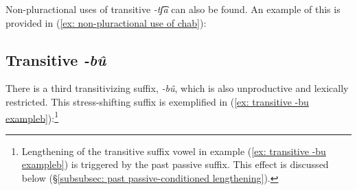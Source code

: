 Non-pluractional uses of transitive \textit{-tʃ͡a} can also be found. An example of this is provided in (\ref{ex: non-pluractional use of chab}):

\ea\label{ex: non-pluractional use of cha}

    \label{ex: non-pluractional use of chaa}
        \label{ex: non-pluractional use of chab}
    \z
\z

\subsection{Transitive \textit{-bû}}
\label{subsec: transitive -bû}

There is a third transitivizing suffix, \textit{-bû}, which is also unproductive and lexically restricted. This stress-shifting suffix is exemplified in (\ref{ex: transitive -bu exampleb}):\footnote{Lengthening of the transitive suffix vowel in example (\ref{ex: transitive -bu exampleb}) is triggered by the past passive suffix. This effect is discussed below (§\ref{subsubsec: past passive-conditioned lengthening}).}

\ea\label{ex: transitive -bu example}

    \label{ex: transitive -bu examplea}
        \label{ex: transitive -bu exampleb}
    \z
\z


